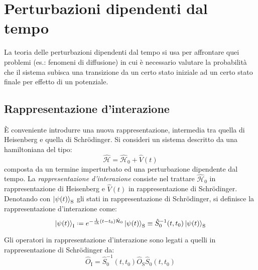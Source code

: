 \section{Perturbazioni dipendenti dal tempo}

La teoria delle perturbazioni dipendenti dal tempo si usa per affrontare quei problemi (es.: fenomeni di diffusione) in cui è necessario valutare la probabilità che il sistema subisca una transizione da un certo stato iniziale ad un certo stato finale per effetto di un potenziale.

\subsection{Rappresentazione d'interazione}

È conveniente introdurre una nuova rappresentazione, intermedia tra quella di Heisenberg e quella di Schrödinger.
Si consideri un sistema descritto da una hamiltoniana del tipo:
\begin{equation}
	\hat{\mathcal{H}} = \hat{\mathcal{H}}_0 + \hat{V}(t)
	\label{eq:5.15}
\end{equation}
composta da un termine imperturbato ed una perturbazione dipendente dal tempo. La \textit{rappresentazione d'interazione} consiste nel trattare $ \hat{\mathcal{H}}_0 $ in rappresentazione di Heisenberg e $ \hat{V}(t) $ in rappresentazione di Schrödinger. Denotando con $ \ket{\psi(t)}_{\text{S}} $ gli stati in rappresentazione di Schrödinger, si definisce la rappresentazione d'interazione come:
\begin{equation}
	\ket{\psi(t)}_{\text{I}} \defeq e^{-\frac{1}{i\hbar} (t - t_0) \hat{\mathcal{H}}_0} \ket{\psi(t)}_{\text{S}} \equiv \hat{S}_0^{-1}(t,t_0) \ket{\psi(t)}_{\text{S}}
	\label{eq:5.16}
\end{equation}

\begin{proposition}
	Gli operatori in rappresentazione d'interazione sono legati a quelli in rappresentazione di Schrödinger da:
	\begin{equation}
		\hat{O}_{\text{I}} = \hat{S}_0^{-1}(t,t_0) \hat{O}_{\text{S}} \hat{S}_0(t,t_0)
		\label{eq:5.17}
	\end{equation}
\end{proposition}

